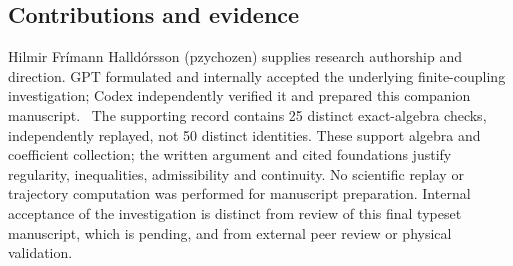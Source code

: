 \subsection*{Contributions and evidence}
Hilmir Fr\'imann Halld\'orsson (pzychozen) supplies research authorship and direction. GPT formulated and internally accepted the underlying finite-coupling investigation; Codex independently verified it and prepared this companion manuscript.~\cite{investigation,review}
The supporting record contains 25 distinct exact-algebra checks, independently replayed, not 50 distinct identities. These support algebra and coefficient collection; the written argument and cited foundations justify regularity, inequalities, admissibility and continuity. No scientific replay or trajectory computation was performed for manuscript preparation. Internal acceptance of the investigation is distinct from review of this final typeset manuscript, which is pending, and from external peer review or physical validation.
